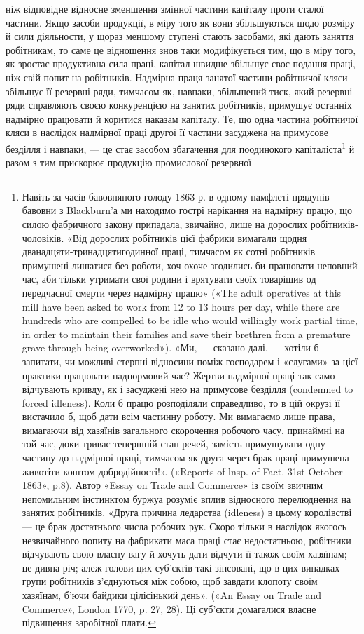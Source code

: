 \parcont{}  %
ніж відповідне відносне зменшення змінної частини капіталу
проти сталої частини. Якщо засоби продукції, в міру того як
вони збільшуються щодо розміру й сили діяльности, у щораз
меншому ступені стають засобами, які дають заняття робітникам,
то саме це відношення знов таки модифікується тим, що в міру
того, як зростає продуктивна сила праці, капітал швидше збільшує
своє подання праці, ніж свій попит на робітників. Надмірна
праця занятої частини робітничої кляси збільшує її резервні
ряди, тимчасом як, навпаки, збільшений тиск, який резервні
ряди справляють своєю конкуренцією на занятих робітників,
примушує останніх надмірно працювати й коритися наказам
капіталу. Те, що одна частина робітничої кляси в наслідок надмірної
праці другої її частини засуджена на примусове безділля
і навпаки, — це стає засобом збагачення для поодинокого капіталіста\footnote{
Навіть за часів бавовняного голоду 1863 р. в одному памфлеті
прядунів бавовни з Blackburn’а ми находимо гострі нарікання на надмірну
працю, що силою фабричного закону припадала, звичайно, лише
на дорослих робітників-чоловіків. «Від дорослих робітників цієї фабрики
вимагали щодня дванадцяти-тринадцятигодинної праці, тимчасом
як сотні робітників примушені лишатися без роботи, хоч охоче згодились
би працювати неповний час, аби тільки утримати свої родини і врятувати
своїх товарішив од передчасної смерти через надмірну працю» («The
adult operatives at this mill have been asked to work from 12 to 13 hours
per day, while there are hundreds who are compelled to be idle who would
willingly work partial time, in order to maintain their families and save
their brethren from a premature grave through being overworked»). «Ми, —
сказано далі, — хотіли б запитати, чи можливі стерпні відносини поміж
господарем і «слугами» за цієї практики працювати наднормовий час?
Жертви надмірної праці так само відчувають кривду, як і засуджені
нею на примусове безділля (condemned to forced idleness). Коли б працю
розподіляли справедливо, то в цій окрузі її вистачило б, щоб дати всім
частинну роботу. Ми вимагаємо лише права, вимагаючи від хазяїнів загального
скорочення робочого часу, принаймні на той час, доки триває
тепершній стан речей, замість примушувати одну частину до надмірної
праці, тимчасом як друга через брак праці примушена животіти коштом
добродійності!». («Reports of lnsp. of Fact. 31st October 1863», p.8).
Автор «Essay on Trade and Commerce» із своїм звичним непомильним
інстинктом буржуа розуміє вплив відносного перелюднення на занятих
робітників. «Друга причина ледарства (idleness) в цьому королівстві —
це брак достатнього числа робочих рук. Скоро тільки в наслідок якогось
незвичайного попиту на фабрикати маса праці стає недостатньою, робітники
відчувають свою власну вагу й хочуть дати відчути її також своїм
хазяїнам; це дивна річ; алеж голови цих суб’єктів такі зіпсовані, що в цих
випадках групи робітників з’єднуються між собою, щоб завдати клопоту
своїм хазяїнам, б’ючи байдики цілісінький день». («An Essay on Trade
and Commerce», London 1770, p. 27, 28). Ці суб’єкти домагалися власне
підвищення заробітної плати.
} й разом з тим прискорює продукцію промислової резервної
